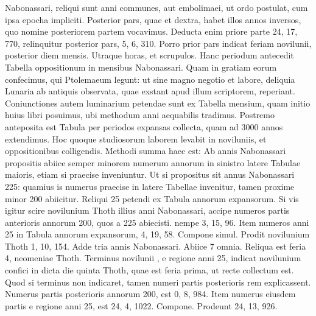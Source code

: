 Nabonassari, reliqui sunt anni communes, aut embolimaei, ut ordo
postulat, cum ipsa epocha impliciti.
Posterior pars, quae et dextra, habet
illos annos inversos, quo nomine posteriorem partem vocavimus.
Deducta enim priore parte 24, 17, 770, relinquitur posterior pars,
5, 6, 310.
Porro prior pars indicat feriam novilunii, posterior diem mensis.
%
Utraque horas, et scrupulos.
%
%
Hanc periodum antecedit
Tabella oppositionum
in mensibus Nabonassari. %
Quam
in gratiam eorum confecimus,
qui Ptolemaeum legunt: ut sine
magno negotio et labore,
deliquia Lunaria ab antiquis
observata, quae exstant apud illum
scriptorem, reperiant.
Coniunctiones autem luminarium
petendae sunt ex Tabella
mensium, quam initio huius
libri posuimus, ubi methodum
anni aequabilis tradimus.
Postremo
anteposita est Tabula
per periodos expansas collecta,
quam ad 3000 annos extendimus.
Hoc quoque studiosorum
laborem levabit in noviluniis,
et oppositionibus colligendis.
Methodi summa haec est: Ab
annis Nabonassari propositis abiice semper minorem numerum annorum
in sinistro latere Tabulae maioris, etiam si praecise inveniuntur.
%
Ut si propositus sit annus Nabonassari 225: quamius is numerus
praecise in latere Tabellae invenitur, tamen proxime minor 200 abiicitur.
Reliqui 25 petendi ex Tabula annorum expansorum.
Si vis igitur
scire novilunium Thoth illius anni Nabonassari, accipe numeros
partis anterioris annorum 200, quos a 225 abiecisti. %
 nempe 3, 15,
96.
Item numeros anni 25 in Tabula annorum expansorum, 4, 19,
58.
Compone simul. %
Prodit novilunium Thoth 1, 10, 154.
Adde tria
annis Nabonassari.
Abiice 7 omnia.
Reliqua est feria 4, neomeniae
Thoth.
Terminus novilunii , e regione anni 25, indicat novilunium
confici in dicta die quinta Thoth, quae est feria prima, ut recte
collectum est.
Quod si terminus non indicaret, tamen numeri partis
posterioris rem explicassent.
Numerus partis posterioris annorum
200, est 0, 8, 984.
Item numerus eiusdem partis e regione anni 25,
est 24, 4, 1022.
Compone.
Prodeunt 24, 13, 926.
